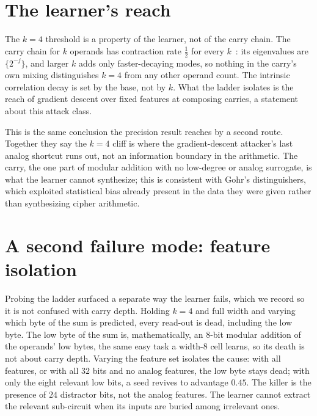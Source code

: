 \documentclass[11pt]{article}
\begin{document}
\section{The learner's reach}\label{sec:learner}

The $k=4$ threshold is a property of the learner, not of the carry chain.
The carry chain for $k$ operands has contraction rate $\tfrac12$ for every
$k$~\cite{paperII}: its eigenvalues are $\{2^{-j}\}$, and larger $k$ adds
only faster-decaying modes, so nothing in the carry's own mixing
distinguishes $k=4$ from any other operand count. The intrinsic
correlation decay is set by the base, not by $k$. What the ladder isolates
is the reach of gradient descent over fixed features at composing carries,
a statement about this attack class.

This is the same conclusion the precision result reaches by a second route.
Together they say the $k=4$ cliff is where the gradient-descent attacker's
last analog shortcut runs out, not an information boundary in the
arithmetic. The carry, the one part of modular addition with no low-degree
or analog surrogate, is what the learner cannot synthesize; this is
consistent with Gohr's distinguishers, which exploited statistical bias
already present in the data they were given rather than synthesizing cipher
arithmetic.

\section{A second failure mode: feature isolation}\label{sec:isolation}

Probing the ladder surfaced a separate way the learner fails, which we
record so it is not confused with carry depth. Holding $k=4$ and full width
and varying which byte of the sum is predicted, every read-out is dead,
including the low byte. The low byte of the sum is, mathematically, an
$8$-bit modular addition of the operands' low bytes, the same easy task a
width-$8$ cell learns, so its death is not about carry depth. Varying the
feature set isolates the cause: with all features, or with all $32$ bits
and no analog features, the low byte stays dead; with only the eight
relevant low bits, a seed revives to advantage $0.45$. The killer is the
presence of $24$ distractor bits, not the analog features. The learner
cannot extract the relevant sub-circuit when its inputs are buried among
irrelevant ones.
\end{document}
